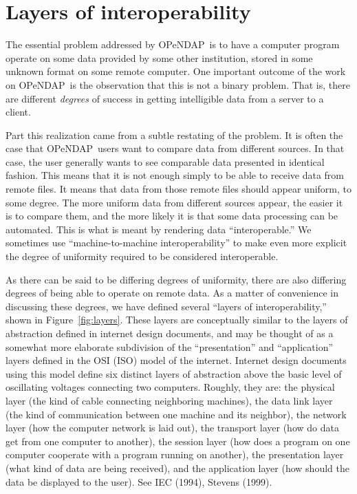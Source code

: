 \documentclass{codata}
\newcommand{\opendap}{\ac{OPeNDAP}}
\begin{document}
\section{Layers of interoperability}

The essential problem addressed by \opendap\ is to have a
computer program operate on some data provided by some other
institution, stored in some unknown format on some remote computer.
One important outcome of the work on \opendap\ is the observation that
this is not a binary problem.  That is, there are different
\emph{degrees} of success in getting intelligible data from a server
to a client.

Part this realization came from a subtle restating of the
problem.  It is often the case that \opendap\ users want to compare
data from different sources.  In that case, the user generally wants
to see comparable data presented in identical fashion.  This means
that it is not enough simply to be able to receive data from remote
files.  It means that data from those remote files should appear
uniform, to some degree.  The more uniform data from different sources
appear, the easier it is to compare them, and the more likely it is
that some data processing can be automated.  This is what is meant by
rendering data ``interoperable.''  We sometimes use
``machine-to-machine interoperability'' to make even more explicit the
degree of uniformity required to be considered interoperable.

As there can be said to be differing degrees of uniformity, there are
also differing degrees of being able to operate on remote data.  As a
matter of convenience in discussing these degrees, we have defined
several ``layers of interoperability,'' shown in
Figure~\ref{fig:layers}.  These layers are conceptually similar to the
layers of abstraction defined in internet design documents, and may be
thought of as a somewhat more elaborate subdivision of the
``presentation'' and ``application'' layers defined in the OSI (ISO)
model of the internet.  Internet design documents using this model
define six distinct layers of abstraction above the basic level of
oscillating voltages connecting two computers.  Roughly, they are: the
physical layer (the kind of cable connecting neighboring machines),
the data link layer (the kind of communication between one machine and
its neighbor), the network layer (how the computer network is laid
out), the transport layer (how do data get from one computer to
another), the session layer (how does a program on one computer
cooperate with a program running on another), the presentation layer
(what kind of data are being received), and the application layer (how
should the data be displayed to the user).  See IEC (1994), Stevens
(1999).
\end{document}
